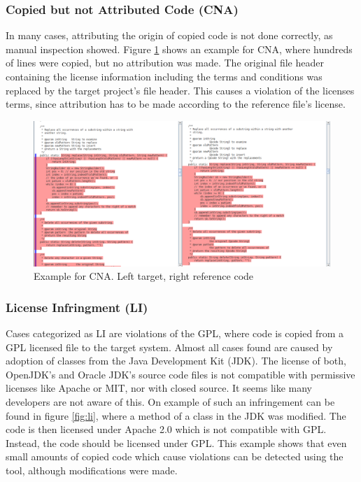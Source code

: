 \subsubsection*{Copied but not Attributed Code (CNA)}
In many cases, attributing the origin of copied code is not done correctly, as manual inspection showed.
Figure \ref{fig:cna} shows an example for CNA, where hundreds of lines were copied, but no attribution was made.
The original file header containing the license information including the terms and conditions was replaced by the target project's file header.
This causes a violation of the licenses terms, since attribution has to be made according to the reference file's license.
\begin{figure}[htpb]
	\centering
	\includegraphics[width=\linewidth, trim={1mm 3,8cm 0 0}, clip]{figures/cna.png}
	\caption{Example for CNA. Left target, right reference code}\label{fig:cna}
\end{figure}

\newpage
\subsubsection*{License Infringment (LI)}
Cases categorized as LI are violations of the GPL, where code is copied from a GPL licensed file to the target system.
Almost all cases found are caused by adoption of classes from the Java Development Kit (JDK).
The license of both, OpenJDK's and Oracle JDK's source code files is not compatible with permissive licenses like Apache or MIT, nor with closed source.
It seems like many developers are not aware of this.
On example of such an infringement can be found in figure \ref{fig:li}, where a method of a class in the JDK was modified.
The code is then licensed under Apache 2.0 which is not compatible with GPL.
Instead, the code should be licensed under GPL.
This example shows that even small amounts of copied code which cause violations can be detected using the tool, although modifications were made.

